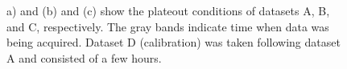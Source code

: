 \begin{figure}[hbtp]
\centering
{}\\
\\
\caption{a) and (b) and (c) show the plateout conditions of datasets A, B, and C, respectively. The gray bands indicate time when data was being acquired. Dataset D (calibration) was taken following dataset A and consisted of a few hours.}
\label{fig:plate_out}
\end{figure}


